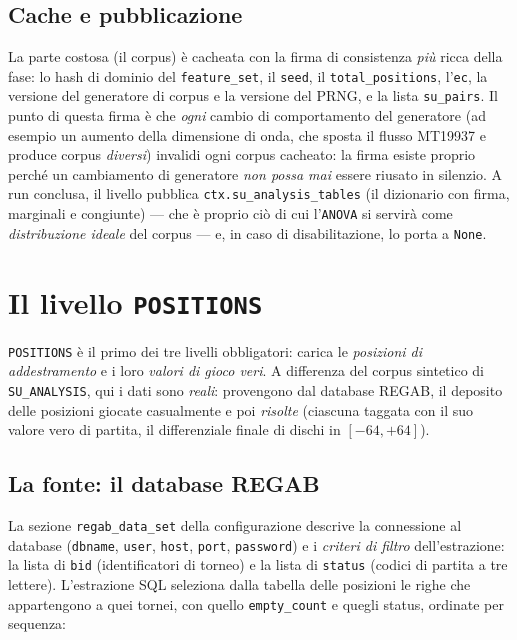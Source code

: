 \subsection{Cache e pubblicazione}

La parte costosa (il corpus) è cacheata con la firma di consistenza
\emph{più} ricca della fase: lo hash di dominio del \texttt{feature\_set}, il
\texttt{seed}, il \texttt{total\_positions}, l'\texttt{ec}, la versione del
generatore di corpus e la versione del PRNG, e la lista \texttt{su\_pairs}.
Il punto di questa firma è che \emph{ogni} cambio di comportamento del
generatore (ad esempio un aumento della dimensione di onda, che sposta il
flusso MT19937 e produce corpus \emph{diversi}) invalidi ogni corpus cacheato:
la firma esiste proprio perché un cambiamento di generatore \emph{non possa
mai} essere riusato in silenzio. A run conclusa, il livello pubblica
\texttt{ctx.su\_analysis\_tables} (il dizionario con firma, marginali e
congiunte) — che è proprio ciò di cui l'\texttt{ANOVA} si servirà come
\emph{distribuzione ideale} del corpus — e, in caso di disabilitazione, lo
porta a \texttt{None}.

\section{Il livello \texttt{POSITIONS}}
\label{sec:corpus-positions}

\texttt{POSITIONS} è il primo dei tre livelli obbligatori: carica le
\emph{posizioni di addestramento} e i loro \emph{valori di gioco veri}. A
differenza del corpus sintetico di \texttt{SU\_ANALYSIS}, qui i dati sono
\emph{reali}: provengono dal database REGAB, il deposito delle posizioni
giocate casualmente e poi \emph{risolte} (ciascuna taggata con il suo valore
vero di partita, il differenziale finale di dischi in $[-64, +64]$).

\subsection{La fonte: il database REGAB}

La sezione \texttt{regab\_data\_set} della configurazione descrive la
connessione al database (\texttt{dbname}, \texttt{user}, \texttt{host},
\texttt{port}, \texttt{password}) e i \emph{criteri di filtro} dell'estrazione:
la lista di \texttt{bid} (identificatori di torneo) e la lista di
\texttt{status} (codici di partita a tre lettere). L'estrazione SQL seleziona
dalla tabella delle posizioni le righe che appartengono a quei tornei, con
quello \texttt{empty\_count} e quegli status, ordinate per sequenza:

